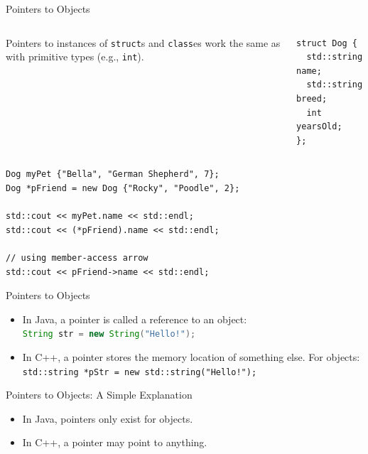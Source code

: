\documentclass[14pt,aspectratio=1610]{beamer}
\begin{document}
\begin{frame}[fragile]{Pointers to Objects}
\begin{columns}
Pointers to instances of \lstinline{struct}s and \lstinline{class}es
work the same as with primitive types (e.g., \lstinline{int}).
\begin{minipage}{\dimexpr\textwidth-2\fboxsep-2\fboxrule-20pt} 
\begin{lstlisting}[basicstyle=\footnotesize\ttfamily, xleftmargin=0pt]
struct Dog {
  std::string name;
  std::string breed;
  int yearsOld;
};
\end{lstlisting}
\end{minipage} 
\end{columns}
\begin{minipage}{\dimexpr\textwidth-2\fboxsep-2\fboxrule-60pt} 
\begin{lstlisting}[basicstyle=\footnotesize\ttfamily]
Dog myPet {"Bella", "German Shepherd", 7};
Dog *pFriend = new Dog {"Rocky", "Poodle", 2};

std::cout << myPet.name << std::endl;
std::cout << (*pFriend).name << std::endl;

// using member-access arrow
std::cout << pFriend->name << std::endl;
\end{lstlisting}
\end{minipage} 

\end{frame}

\begin{frame}{Pointers to Objects}
\begin{itemize}
\item In Java, a pointer is called a reference to an object:\\
\lstinline[language=Java]{String str = new String("Hello!");}
\item In C++, a pointer stores the memory location of something else. For objects:\\
\lstinline{std::string *pStr = new std::string("Hello!");}

\end{itemize}
\end{frame}

\begin{frame}{Pointers to Objects: A Simple Explanation}
\begin{itemize}\large
\item In Java, pointers only exist for objects.
\item In C++, a pointer may point to anything.
\end{itemize}
\end{frame}
\end{document}
